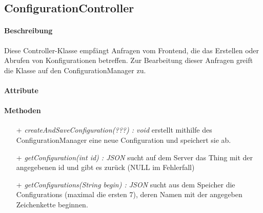 \subsection{ConfigurationController}

\paragraph{Beschreibung}
Diese Controller-Klasse empfängt Anfragen vom Frontend, die das Erstellen oder Abrufen von Konfigurationen betreffen. Zur Bearbeitung dieser Anfragen greift die Klasse auf den ConfigurationManager zu.


\paragraph{Attribute}

\paragraph{Methoden}
\begin{itemize}
\item[+] \textit{ createAndSaveConfiguration(???) : void }
erstellt mithilfe des ConfigurationManager eine neue Configuration und speichert sie ab.
\item[+] \textit{getConfiguration(int id) : JSON}
sucht auf dem Server das Thing mit der angegebenen id und gibt es zurück (NULL im Fehlerfall)
\item[+] \textit{getConfigurations(String begin) : JSON }
sucht aus dem Speicher die Configurations (maximal die ersten 7), deren Namen mit der angegeben Zeichenkette beginnen.
\end{itemize}